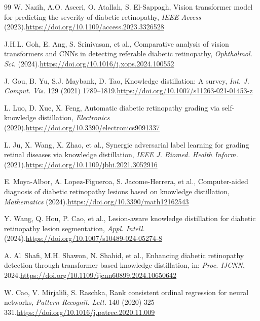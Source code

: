 \documentclass[a4paper,fleqn]{cas-dc}
\begin{document}
\begin{thebibliography}{99}
W. Nazih, A.O. Aseeri, O. Atallah, S. El-Sappagh,
Vision transformer model for predicting the severity of diabetic retinopathy,
\textit{IEEE Access} (2023).\newline\url{https://doi.org/10.1109/access.2023.3326528}

J.H.L. Goh, E. Ang, S. Srinivasan, et al.,
Comparative analysis of vision transformers and CNNs in detecting referable diabetic retinopathy,
\textit{Ophthalmol. Sci.} (2024).\newline\url{https://doi.org/10.1016/j.xops.2024.100552}

J. Gou, B. Yu, S.J. Maybank, D. Tao,
Knowledge distillation: A survey,
\textit{Int. J. Comput. Vis.} 129 (2021) 1789--1819.\newline\url{https://doi.org/10.1007/s11263-021-01453-z}

L. Luo, D. Xue, X. Feng,
Automatic diabetic retinopathy grading via self-knowledge distillation,
\textit{Electronics} (2020).\newline\url{https://doi.org/10.3390/electronics9091337}

L. Ju, X. Wang, X. Zhao, et al.,
Synergic adversarial label learning for grading retinal diseases via knowledge distillation,
\textit{IEEE J. Biomed. Health Inform.} (2021).\newline\url{https://doi.org/10.1109/jbhi.2021.3052916}

E. Moya-Albor, A. Lopez-Figueroa, S. Jacome-Herrera, et al.,
Computer-aided diagnosis of diabetic retinopathy lesions based on knowledge distillation,
\textit{Mathematics} (2024).\newline\url{https://doi.org/10.3390/math12162543}

Y. Wang, Q. Hou, P. Cao, et al.,
Lesion-aware knowledge distillation for diabetic retinopathy lesion segmentation,
\textit{Appl. Intell.} (2024).\newline\url{https://doi.org/10.1007/s10489-024-05274-8}

A. Al~Shafi, M.H. Shawon, N. Shahid, et al.,
Enhancing diabetic retinopathy detection through transformer based knowledge distillation,
in: \textit{Proc. IJCNN}, 2024.\newline\url{https://doi.org/10.1109/ijcnn60899.2024.10650642}

W. Cao, V. Mirjalili, S. Raschka,
Rank consistent ordinal regression for neural networks,
\textit{Pattern Recognit. Lett.} 140 (2020) 325--331.\newline\url{https://doi.org/10.1016/j.patrec.2020.11.009}


\end{thebibliography}
\end{document}
